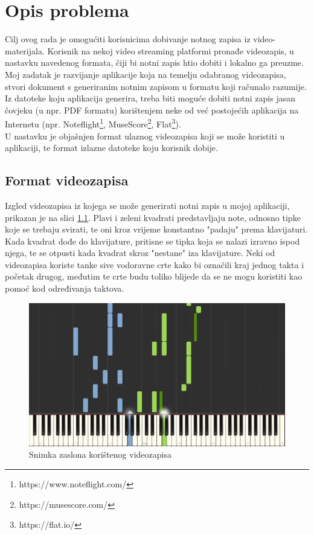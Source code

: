 \documentclass[times, utf8, zavrsni, numeric]{fer}
\begin{document}
\chapter{Opis problema}
Cilj ovog rada je omogućiti korisnicima dobivanje notnog zapisa iz video-materijala. Korisnik na nekoj video streaming platformi pronađe videozapis, u nastavku navedenog formata, čiji bi notni zapis htio dobiti i lokalno ga preuzme. Moj zadatak je razvijanje aplikacije koja na temelju odabranog videozapisa, stvori dokument s generiranim notnim zapisom u formatu koji računalo razumije. Iz datoteke koju aplikacija generira, treba biti moguće dobiti notni zapis jasan čovjeku (u npr. PDF formatu) korištenjem neke od već postojećih aplikacija na Internetu (npr. Noteflight\footnote{https://www.noteflight.com/}, MuseScore\footnote{https://musescore.com/}, Flat\footnote{https://flat.io/}).\\

U nastavku je objašnjen format ulaznog videozapisa koji se može koristiti u aplikaciji, te format izlazne datoteke koju korisnik dobije.

\section{Format videozapisa}
Izgled videozapisa iz kojega se može generirati notni zapis u mojoj aplikaciji, prikazan je na slici \ref{fig:nttdscreen}. Plavi i zeleni kvadrati predstavljaju note, odnosno tipke koje se trebaju svirati, te oni kroz vrijeme konstantno "padaju" prema klavijaturi. Kada kvadrat dođe do klavijature, pritisne se tipka koja se nalazi izravno ispod njega, te se otpusti kada kvadrat skroz "nestane" iza klavijature. Neki od videozapisa koriste tanke sive vodoravne crte kako bi označili kraj jednog takta i početak drugog, međutim te crte budu toliko blijede da se ne mogu koristiti kao pomoć kod određivanja taktova.\\

\begin{figure}[h]
	\includegraphics[scale=0.25]{nttdscreen.png}
	\centering
	\caption{Snimka zaslona korištenog videozapisa\cite{nttd}}
	\label{fig:nttdscreen}
\end{figure}
\end{document}
